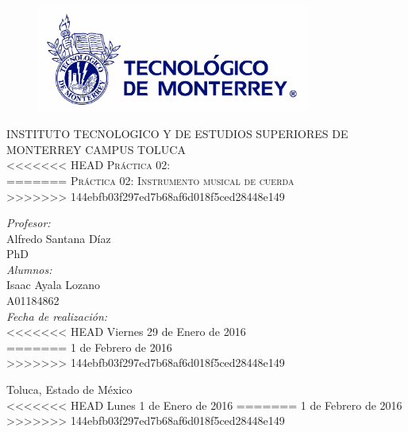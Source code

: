 \begin{titlepage}
\begin{center}
\begin{figure}[!htbp]
\centering
\includegraphics[width=90mm]{./img/logo_itesm.jpg}
\end{figure}


\textsc{ INSTITUTO TECNOLOGICO Y DE ESTUDIOS SUPERIORES DE MONTERREY
CAMPUS TOLUCA}\\[1.5cm]

<<<<<<< HEAD
\textsc{ Pr\'actica 02: }\\[0.5cm]
=======
\textsc{ Pr\'actica 02: Instrumento musical de cuerda}\\[0.5cm]
>>>>>>> 144ebfb03f297ed7b68af6d018f5ced28448e149


\emph{Profesor:}\\
 Alfredo Santana D\'iaz\\
 PhD\\
 \medskip
\emph{Alumnos:} \\
Isaac Ayala Lozano\\A01184862\\
 \medskip
\emph{Fecha de realizaci\'on:}\\
<<<<<<< HEAD
Viernes 29 de Enero de 2016\\
=======
1 de Febrero de 2016\\
>>>>>>> 144ebfb03f297ed7b68af6d018f5ced28448e149
\vfill


{\large
Toluca, Estado de M\'exico\\
<<<<<<< HEAD
Lunes 1 de Enero de 2016
=======
1 de Febrero de 2016
>>>>>>> 144ebfb03f297ed7b68af6d018f5ced28448e149
}

\end{center}
\end{titlepage}
